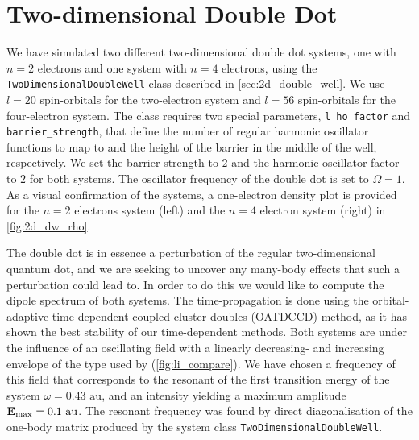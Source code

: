 \section{Two-dimensional Double Dot}

We have simulated two different two-dimensional double dot systems, one with $n=2$ electrons 
and 
one system with $n=4$ electrons, using the \lstinline{TwoDimensionalDoubleWell} class described
in \autoref{sec:2d_double_well}. We use $l=20$ spin-orbitals for the two-electron system 
and $l=56$ spin-orbitals for the four-electron system. The class requires two special parameters, 
\lstinline{l_ho_factor} and \lstinline{barrier_strength}, that define the 
number of regular harmonic oscillator functions to map to and the height of the 
barrier in the middle of the well, respectively. We set the barrier strength to $2$ 
and the harmonic oscillator factor to $2$ for both systems. The oscillator frequency 
of the double dot is set to $\Omega=1$. As a visual confirmation of the systems, a 
one-electron density plot is provided for the $n=2$ electrons system (left) and 
the $n=4$ electron system (right) in \autoref{fig:2d_dw_rho}.

The double dot is in essence a perturbation of the regular two-dimensional quantum dot, and we are seeking to uncover any many-body 
effects that such a perturbation could lead to. In order to do this we would like to 
compute the dipole spectrum of both systems. The time-propagation is done using the 
orbital-adaptive time-dependent coupled cluster doubles (OATDCCD) method, as it has shown 
the best stability of our time-dependent methods. Both systems are under the influence of an 
oscillating field with a linearly decreasing- and increasing envelope of the type used by 
\citeauthor{li2005time}\cite{li2005time} (\autoref{fig:li_compare}). We have chosen a 
frequency of this field that corresponds to the resonant of the first transition energy 
of the system $\omega = 0.43 \text{ au}$, and an intensity yielding a maximum amplitude
$\vb{E}_\text{max} = 0.1 \text{ au}$. The resonant frequency was found by direct diagonalisation 
of the one-body matrix produced by the system class \lstinline{TwoDimensionalDoubleWell}.

